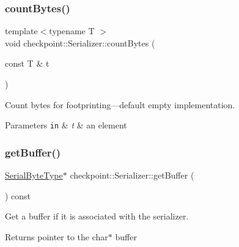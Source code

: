 \subsubsection{\texorpdfstring{count\+Bytes()}{countBytes()}}
{\footnotesize\ttfamily template$<$typename T $>$ \\
void checkpoint\+::\+Serializer\+::count\+Bytes (\begin{DoxyParamCaption}\item[{const T \&}]{t }\end{DoxyParamCaption})\hspace{0.3cm}{\ttfamily [inline]}}



Count bytes for footprinting---default empty implementation. 


\begin{DoxyParams}[1]{Parameters}
\mbox{\tt in}  & {\em t} & an element \\
\hline
\end{DoxyParams}
\mbox{\label{structcheckpoint_1_1_serializer_a6231bd380e02ee8668e7a6efebca2664}} 
\subsubsection{\texorpdfstring{get\+Buffer()}{getBuffer()}}
{\footnotesize\ttfamily \hyperlink{namespacecheckpoint_ae57f01cdc0b81776c23b6c7c934c58f5}{Serial\+Byte\+Type}$\ast$ checkpoint\+::\+Serializer\+::get\+Buffer (\begin{DoxyParamCaption}{ }\end{DoxyParamCaption}) const\hspace{0.3cm}{\ttfamily [inline]}}



Get a buffer if it is associated with the serializer. 

\begin{DoxyReturn}{Returns}
pointer to the {\ttfamily char$\ast$} buffer 
\end{DoxyReturn}
\mbox{\label{structcheckpoint_1_1_serializer_a2b22a87a81fb9ff1b00dd96bbe4debe2}} 

